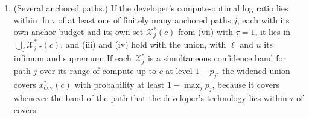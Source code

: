 \begin{proposition}
\begin{enumerate}
every $c\in[c_J,\bar c]$ simultaneously with probability at least $1-p$.
\item[(viii)] (Several anchored paths.) If the developer's compute-optimal log ratio lies within $\ln\tau$ of at least
one of finitely many anchored paths $j$, each with its own anchor budget and its own set $\mathcal X^*_j(c)$ from (vii)
with $\tau=1$, it lies in $\bigcup_j\mathcal X^*_{j,\tau}(c)$, and (iii) and (iv) hold with the union, with $\ell$ and $u$
its infimum and supremum. If each $\mathcal X^*_j$ is a simultaneous confidence band for path $j$ over its range of compute
up to $\bar c$ at level $1-p_j$, the widened union covers $x^*_{\mathrm{dev}}(c)$ with probability at least
$1-\max_jp_j$, because it covers whenever the band of the path that the developer's technology lies within $\tau$ of
covers.
\end{enumerate}
\end{proposition}

